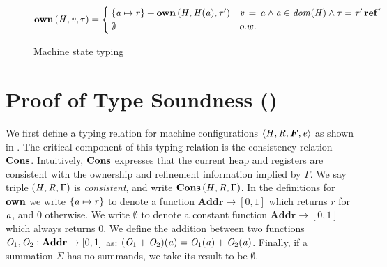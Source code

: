 \begin{figure}
\begin{align*}
    \mathbf{own} \, (  \mathit{H}  ,  \mathit{v}  ,  \tau  ) & = \begin{cases}
      \{  \mathit{a}  \mapsto  r  \}  +  \mathbf{own} \, (  \mathit{H}  ,  \mathit{H}  (  \mathit{a}  )  ,  \tau'  ) & \mathit{v} \, = \, \mathit{a}  \wedge   \mathit{a}  \in \mathit{dom}( \mathit{H} )   \wedge  \tau  =   \tau'  \operatorname{\mathbf{ref}}^{ r }  \\
       \emptyset  & o.w.
    \end{cases} \\
  \end{align*}
\caption{Machine state typing}
\label{fig:state-typing}
\end{figure}

\section{Proof of Type Soundness ()}

We first define a typing relation for machine configurations $ \tuple{ \ottnt{H} ,  \ottnt{R} ,  \oldvec{F} ,  \ottnt{e} } $ as shown in
. The critical component of this typing relation is the consistency relation $\mathbf{Cons}$.
Intuitively, $\mathbf{Cons}$ expresses that the current heap and registers are consistent with the ownership
and refinement information implied by $\Gamma$. We say triple $( \mathit{H},\mathit{R},\Gamma )$ is \emph{consistent},
and write $\mathbf{Cons} \, (  \mathit{H}  ,  \mathit{R}  ,  \Gamma  )$. %
In the definitions for $\mathbf{own}$ we write $\{  \mathit{a}  \mapsto  r  \}$ to denote a function $\textbf{Addr} \rightarrow [0,1]$
which returns $r$ for $\mathit{a}$, and $0$ otherwise. We write $ \emptyset $ to denote a constant
function $\textbf{Addr} \rightarrow [0,1]$ which always returns $0$. We define the addition between
two functions $\mathit{O_{{\mathrm{1}}}}, \mathit{O_{{\mathrm{2}}}}: \textbf{Addr} \rightarrow [0,1]$ as: $(  \mathit{O_{{\mathrm{1}}}}  +  \mathit{O_{{\mathrm{2}}}}  )  (  \mathit{a}  )  =  \mathit{O_{{\mathrm{1}}}}  (  \mathit{a}  )  +  \mathit{O_{{\mathrm{2}}}}  (  \mathit{a}  )$.
Finally, if a summation $ \Sigma $ has no summands, we take its result to be $ \emptyset $.

